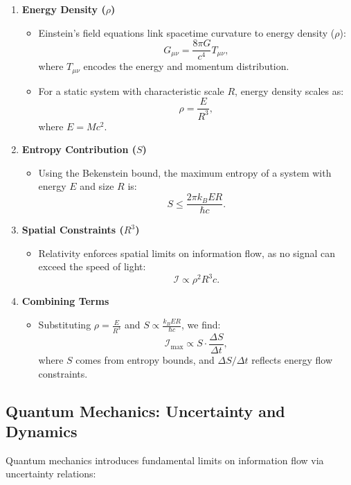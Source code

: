 \documentclass[12pt]{article}
\begin{document}
\begin{enumerate}
    \item \textbf{Energy Density (\(\rho\))}
    \begin{itemize}
        \item Einstein’s field equations link spacetime curvature to energy density (\(\rho\)):
        \[
        G_{\mu\nu} = \frac{8\pi G}{c^4} T_{\mu\nu},
        \]
        where \(T_{\mu\nu}\) encodes the energy and momentum distribution.
        \item For a static system with characteristic scale \(R\), energy density scales as:
        \[
        \rho = \frac{E}{R^3},
        \]
        where \(E = M c^2\).
    \end{itemize}

    \item \textbf{Entropy Contribution (\(S\))}
    \begin{itemize}
        \item Using the Bekenstein bound, the maximum entropy of a system with energy \(E\) and size \(R\) is:
        \[
        S \leq \frac{2\pi k_B E R}{\hbar c}.
        \]
    \end{itemize}

    \item \textbf{Spatial Constraints (\(R^3\))}
    \begin{itemize}
        \item Relativity enforces spatial limits on information flow, as no signal can exceed the speed of light:
        \[
        \mathcal{I} \propto \rho^2 R^3 c.
        \]
    \end{itemize}

    \item \textbf{Combining Terms}
    \begin{itemize}
        \item Substituting \(\rho = \frac{E}{R^3}\) and \(S \propto \frac{k_B E R}{\hbar c}\), we find:
        \[
        \mathcal{I}_{\text{max}} \propto S \cdot \frac{\Delta S}{\Delta t},
        \]
        where \(S\) comes from entropy bounds, and \(\Delta S / \Delta t\) reflects energy flow constraints.
    \end{itemize}
\end{enumerate}

\subsection{Quantum Mechanics: Uncertainty and Dynamics}
Quantum mechanics introduces fundamental limits on information flow via uncertainty relations:
\end{document}
